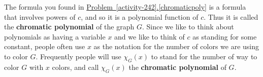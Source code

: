 \documentclass[10pt,]{book}
\newcommand{\terminology}[1]{\textbf{#1}}
\theoremstyle{plain}
\theoremstyle{definition}
\theoremstyle{definition}
\numberwithin{equation}{chapter}
\begin{document}
\hypertarget{p-1409}{}%
The formula you found in \hyperref[chromaticpoly]{Problem~\ref{activity-242}.\ref{chromaticpoly}} is a formula that involves powers of \(c\), and so it is a polynomial function of \(c\). Thus it is called the \terminology{chromatic polynomial} of the graph \(G\). Since we like to think about polynomials as having a variable \(x\) and we like to think of \(c\) as standing for some constant, people often use \(x\) as the notation for the number of colors we are using to color \(G\). Frequently people will use \(\chi_G(x)\) to stand for the number of way to color \(G\) with \(x\) colors, and call \(\chi_G(x)\) the \terminology{chromatic polynomial} of \(G\).%
\typeout{************************************************}
\typeout{************************************************}
\end{document}
